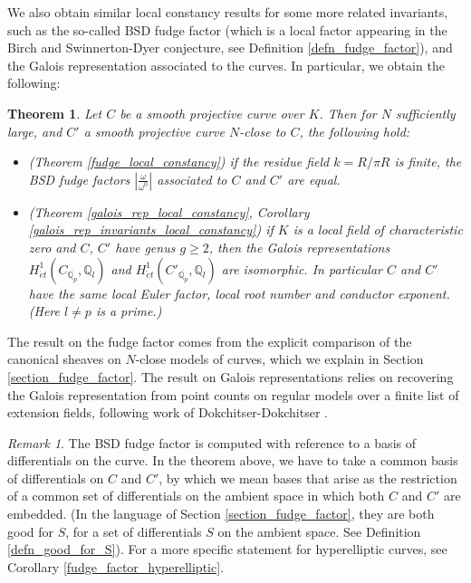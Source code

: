 \documentclass{article}
\theoremstyle{definition}
\theoremstyle{plain}
\newtheorem{thm}[defn]{Theorem}
\theoremstyle{remark}
\newtheorem{remark}[defn]{Remark}
\begin{document}
	We also obtain similar local constancy results for some more related invariants, such as the so-called BSD fudge factor (which is a local factor appearing in the Birch and Swinnerton-Dyer conjecture, see Definition \ref{defn_fudge_factor}), and the Galois representation associated to the curves. In particular, we obtain the following:
	\begin{thm}
		Let $C$ be a smooth projective curve over $K$. Then for $N$ sufficiently large, and $C'$ a smooth projective curve $N$-close to $C$, the following hold:
		\begin{itemize}
			\item (Theorem \ref{fudge_local_constancy}) if the residue field $k = R/\pi R$ is finite, the BSD fudge factors $\left|\frac{\omega}{\omega^0}\right|$ associated to $C$ and $C'$ are equal.
			\item (Theorem \ref{galois_rep_local_constancy}, Corollary \ref{galois_rep_invariants_local_constancy}) if $K$ is a local field of characteristic zero and $C$, $C'$ have genus $g\ge 2$, then the Galois representations $H^1_{\acute{e}t}(C_{\overline{\mathbb{Q}_p}}, \mathbb{Q}_l)$ and $H^1_{\acute{e}t}(C'_{\overline{\mathbb{Q}_p}}, \mathbb{Q}_l)$ are isomorphic. In particular $C$ and $C'$ have the same local Euler factor, local root number and conductor exponent. (Here $l\not= p$ is a prime.)
		\end{itemize}
	\end{thm}
	The result on the fudge factor comes from the explicit comparison of the canonical sheaves on $N$-close models of curves, which we explain in Section \ref{section_fudge_factor}. The result on Galois representations relies on recovering the Galois representation from point counts on regular models over a finite list of extension fields, following work of Dokchitser-Dokchitser \cite{MR4898315}.
	\begin{remark}
		The BSD fudge factor is computed with reference to a basis of differentials on the curve. In the theorem above, we have to take a common basis of differentials on $C$ and $C'$, by which we mean bases that arise as the restriction of a common set of differentials on the ambient space in which both $C$ and $C'$ are embedded. (In the language of Section \ref{section_fudge_factor}, they are both good for $S$, for a set of differentials $S$ on the ambient space. See Definition \ref{defn_good_for_S}). For a more specific statement for hyperelliptic curves, see Corollary \ref{fudge_factor_hyperelliptic}.
	\end{remark}
	
\end{document}
